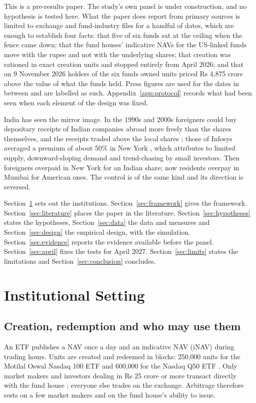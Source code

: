 \documentclass[10pt,journal,a4paper]{IEEEtran}
\theoremstyle{definition}
\begin{document}
This is a pre-results paper. The study's own panel is under construction, and no hypothesis is tested here. What the paper does report from primary sources is limited to exchange and fund-industry files for a handful of dates, which are enough to establish four facts: that five of six funds sat at the ceiling when the fence came down; that the fund houses' indicative NAVs for the US-linked funds move with the rupee and not with the underlying shares; that creation was rationed in exact creation units and stopped entirely from April 2026; and that on 9 November 2026 holders of the six funds owned units priced Rs 4,875 crore above the value of what the funds held. Press figures are used for the dates in between and are labelled as such. Appendix~\ref{app:protocol} records what had been seen when each element of the design was fixed.

India has seen the mirror image. In the 1990s and 2000s foreigners could buy depositary receipts of Indian companies abroad more freely than the shares themselves, and the receipts traded above the local shares \citep{jithendranathan2000barriers,stigler2010understanding}; those of Infosys averaged a premium of about 50\% in New York \citep{financeasia2003}, which \citet{puthenpurackal2006explaining} attributes to limited supply, downward-sloping demand and trend-chasing by small investors. Then foreigners overpaid in New York for an Indian share; now residents overpay in Mumbai for American ones. The control is of the same kind and its direction is reversed.

Section~\ref{sec:institutions} sets out the institutions. Section~\ref{sec:framework} gives the framework. Section~\ref{sec:literature} places the paper in the literature. Section~\ref{sec:hypotheses} states the hypotheses, Section~\ref{sec:data} the data and measures and Section~\ref{sec:design} the empirical design, with the simulation. Section~\ref{sec:evidence} reports the evidence available before the panel. Section~\ref{sec:april} fixes the tests for April 2027. Section~\ref{sec:limits} states the limitations and Section~\ref{sec:conclusion} concludes.

\section{Institutional Setting}\label{sec:institutions}
\subsection{Creation, redemption and who may use them}
An ETF publishes a NAV once a day and an indicative NAV (iNAV) during trading hours. Units are created and redeemed in blocks: 250,000 units for the Motilal Oswal Nasdaq 100 ETF \citep{motilal2026sid} and 600,000 for the Nasdaq Q50 ETF \citep{indmoney2026unwind}. Only market makers and investors dealing in Rs 25 crore or more transact directly with the fund house \citep{mirae2026factsheet}; everyone else trades on the exchange. Arbitrage therefore rests on a few market makers and on the fund house's ability to issue.
\end{document}
